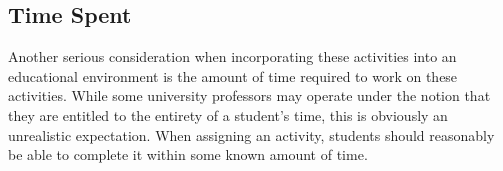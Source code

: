         
    \subsection{Time Spent}
        Another serious consideration when incorporating these activities into an educational environment is the amount of time required to work on these activities. %
While some university professors may operate under the notion that they are entitled to the entirety of a student's time, this is obviously an unrealistic expectation. %
When assigning an activity, students should reasonably be able to complete it within some known amount of time. 

                                        

